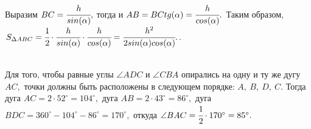 \documentclass[12pt]{article}
\begin{document}
Выразим $BC=\cfrac{h}{sin(\alpha)},$ тогда и $AB=BC tg(\alpha)=\cfrac{h}{cos(\alpha)}.$ Таким образом, $S_{\Delta ABC}=
\cfrac{1}{2}\cdot\cfrac{h}{sin(\alpha)}\cdot\cfrac{h}{cos(\alpha)}=
\cfrac{h^2}{2sin(\alpha)cos(\alpha)}.$\newpage{}. \begin{figure}[ht!]
\end{figure}\\
Для того, чтобы равные углы $\angle ADC$ и $\angle CBA$ опирались на одну и ту же дугу $AC,$ точки должны быть расположены в следующем порядке: $A,\ B,\ D,\ C.$ Тогда дуга $AC=2\cdot 52^\circ=104^\circ,$ дуга $AB=2\cdot43^\circ=86^\circ,$ дуга $BDC=360^\circ-104^\circ-86^\circ=170^\circ,$ откуда $\angle BAC=\cfrac{1}{2}\cdot 170^\circ=85^\circ.$\\
\end{document}
